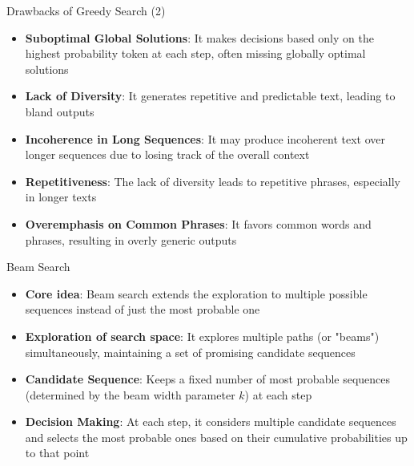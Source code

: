 \documentclass[11pt,compress,t,notes=noshow, xcolor=table]{beamer}
\begin{document}

\begin{frame}{Drawbacks of Greedy Search (2)}

\vfill

\begin{itemize}
    \item \textbf{Suboptimal Global Solutions}: It makes decisions based only on the highest probability token at each step, often missing globally optimal solutions
    \item \textbf{Lack of Diversity}: It generates repetitive and predictable text, leading to bland outputs
    \item \textbf{Incoherence in Long Sequences}: It may produce incoherent text over longer sequences due to losing track of the overall context
    \item \textbf{Repetitiveness}: The lack of diversity leads to repetitive phrases, especially in longer texts
    \item \textbf{Overemphasis on Common Phrases}: It favors common words and phrases, resulting in overly generic outputs
\end{itemize}

\vfill

\end{frame}


\begin{frame}{Beam Search}

\vfill

\begin{itemize}
    \item \textbf{Core idea}: Beam search extends the exploration to multiple possible sequences instead of just the most probable one
    \item \textbf{Exploration of search space}: It explores multiple paths (or "beams") simultaneously, maintaining a set of promising candidate sequences
    \item \textbf{Candidate Sequence}: Keeps a fixed number of most probable sequences (determined by the beam width parameter $k$) at each step
    \item \textbf{Decision Making}: At each step, it considers multiple candidate sequences and selects the most probable ones based on their cumulative probabilities up to that point
\end{itemize}

\vfill

\end{frame}
\end{document}
